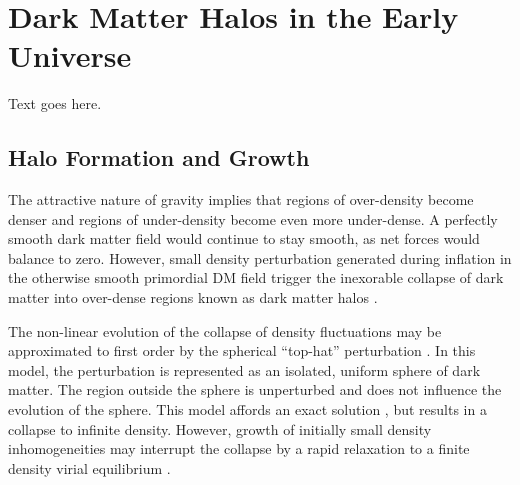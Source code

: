 
%
%

\section{Dark Matter Halos in the Early Universe}
\label{sec:early_universe}



Text goes here.




\subsection{Halo Formation and Growth}
\label{subsec:early_universe--formation_and_growth}


The attractive nature of gravity implies that regions of over-density become denser and regions of under-density become even more under-dense.  A perfectly smooth dark matter field would continue to stay smooth, as net forces would balance to zero.  However, small density perturbation generated during inflation in the otherwise smooth primordial DM field trigger the inexorable collapse of dark matter into over-dense regions known as dark matter halos \citep{1974ApJ...187..425P, 1986ApJ...304...15B}.

The non-linear evolution of the collapse of density fluctuations may be approximated to first order by the spherical ``top-hat'' perturbation \citep{1968ApJ...151..459S, 1970ApJ...162..815P, 1970AJ.....75...13P, 1972ApJ...176....1G}.  In this model, the perturbation is represented as an isolated, uniform sphere of dark matter.  The region outside the sphere is unperturbed and does not influence the evolution of the sphere.  This model affords an exact solution \citep[][and referencees therein]{1980lssu.book.....P, 1993ppc..book.....P, 1993sfu..book.....P}, but results in a collapse to infinite density.  However, growth of initially small density inhomogeneities may interrupt the collapse by a rapid relaxation to a finite density virial equilibrium \citep[][and references therein]{1999MNRAS.307..203S, 1998FCPh...19..157M}.

